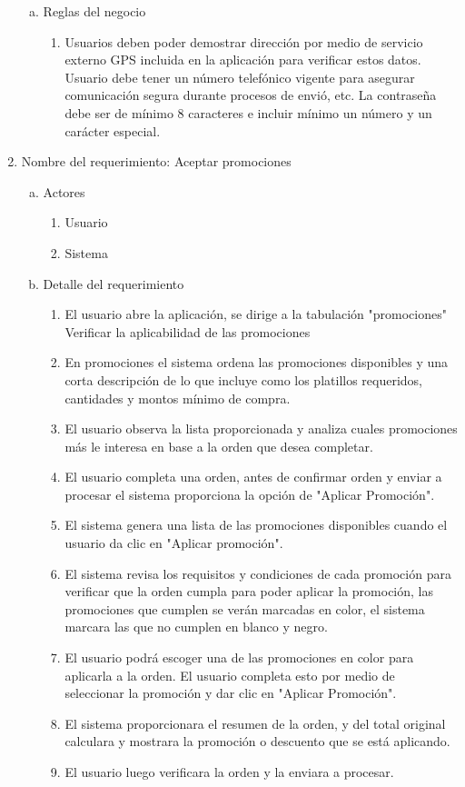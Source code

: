 \documentclass[conference]{IEEEtran}
\begin{document}
\begin{enumerate}
\begin{enumerate}[a)]
\item Reglas del negocio
\begin{enumerate}[a]
\item Usuarios deben poder demostrar dirección por medio de servicio externo GPS incluida en la aplicación para verificar estos datos. Usuario debe tener un número telefónico vigente para asegurar comunicación segura durante procesos de envió, etc. La contraseña debe ser de mínimo 8 caracteres e incluir mínimo un número y un carácter especial.
\end{enumerate}
\end{enumerate}

\item Nombre del requerimiento: Aceptar promociones
\begin{enumerate}[a)]
\item Actores
	\begin{enumerate}[a]
	\item Usuario
	\item Sistema
	\end{enumerate}
\item Detalle del requerimiento
	\begin{enumerate}[P{a}so 1.]
	
\item El usuario abre la aplicación, se dirige a la tabulación "promociones" Verificar la aplicabilidad de las promociones
\item En promociones el sistema ordena las promociones disponibles y una corta descripción de lo que incluye como los platillos requeridos, cantidades y montos mínimo de compra.
\item El usuario observa la lista proporcionada y analiza cuales promociones más le interesa en base a la orden que desea completar.
\item El usuario completa una orden, antes de confirmar orden y enviar a procesar el sistema proporciona la opción de "Aplicar Promoción".
\item El sistema genera una lista de las promociones disponibles cuando el usuario da clic en "Aplicar promoción".
\item El sistema revisa los requisitos y condiciones de cada promoción para verificar que la orden cumpla para poder aplicar la promoción, las promociones que cumplen se verán marcadas en color, el sistema marcara las que no cumplen en blanco y negro.
\item El usuario podrá escoger una de las promociones en color para aplicarla a la orden. El usuario completa esto por medio de seleccionar la promoción y dar clic en "Aplicar Promoción".
\item El sistema proporcionara el resumen de la orden, y del total original calculara y mostrara la promoción o descuento que se está aplicando.
\item El usuario luego verificara la orden y la enviara a procesar.


\end{enumerate}
\end{enumerate}
\end{enumerate}
\end{document}
